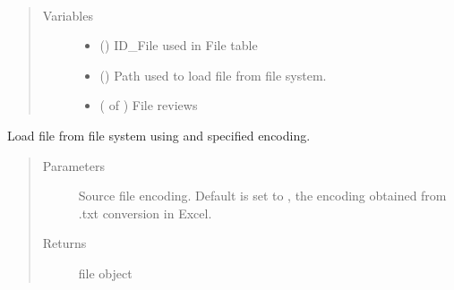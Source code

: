 \documentclass[letterpaper,10pt,english]{sphinxmanual}
\begin{document}
\begin{fulllineitems}
\label{\detokenize{classes:loacore.classes.classes.File}}~\begin{quote}\begin{description}
\item[{Variables}] \leavevmode\begin{itemize}
\item {} 
 () \textendash{} ID\_File used in File table

\item {} 
 () \textendash{} Path used to load file from file system.

\item {} 
 ( of {\hyperref[\detokenize{classes:loacore.classes.classes.Review}]{}}) \textendash{} File reviews

\end{itemize}

\end{description}\end{quote}

\begin{fulllineitems}
\label{\detokenize{classes:loacore.classes.classes.File.load}}
Load file from file system using  and specified encoding.
\begin{quote}\begin{description}
\item[{Parameters}] \leavevmode
{} \textendash{} Source file encoding. Default is set to , the encoding obtained from .txt conversion in Excel.

\item[{Returns}] \leavevmode
file object

\end{description}\end{quote}


\end{fulllineitems}
\end{fulllineitems}
\end{document}

